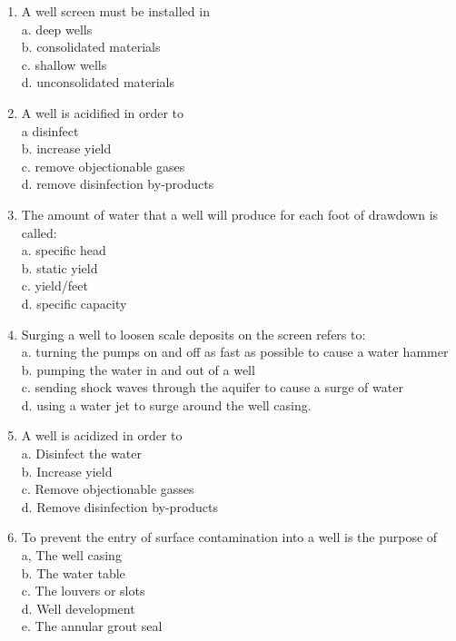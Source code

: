 \documentclass{article}
\begin{document}
\begin{enumerate}
\item A well screen must be installed in\\
a.	deep wells\\
b.	consolidated materials\\
c.	shallow wells\\
d.	unconsolidated materials

\item A well is acidified in order to\\
a	disinfect\\
b.	increase yield\\
c.	remove objectionable gases\\
d.	 remove disinfection by-products\\

\item The amount of water that a well will produce for each foot of drawdown is called:\\
a.	specific head\\
b.	static yield\\
c.	yield/feet\\
d.	specific capacity\\

\item Surging a well to loosen scale deposits on the screen refers to:\\
a.	turning the pumps on and off as fast as possible to cause a water hammer\\
b.	pumping the water in and out of a well\\
c.	sending shock waves through the aquifer to cause a surge of water\\
d.	using a water jet to surge around the well casing.\\


\item A well is acidized in order to\\
a. Disinfect the water\\
b. Increase yield\\
c. Remove objectionable gasses\\
d. Remove disinfection by-products

\item To prevent the entry of surface contamination into a well is the purpose of\\
a, The well casing\\
b. The water table\\
c. The louvers or slots\\
d. Well development\\
e. The annular grout seal\\


\end{enumerate}
\end{document}
